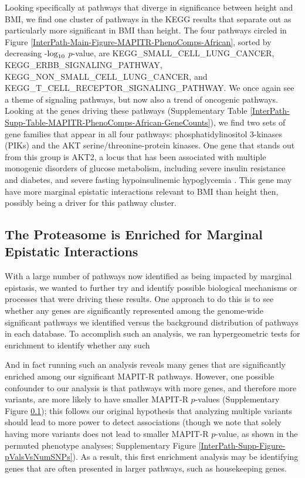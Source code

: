 \documentclass[12pt,a4paper]{article}
\def\log{{\rm log}}
\begin{document}
Looking specifically at pathways that diverge in significance between height and BMI, we find one cluster of pathways in the KEGG results that separate out as particularly more significant in BMI than height. The four pathways circled in Figure \ref{InterPath-Main-Figure-MAPITR-PhenoComps-African}, sorted by decreasing -$\log_{10}$ $p$-value, are KEGG\_SMALL\_CELL\_LUNG\_CANCER, KEGG\_ERBB\_SIGNALING\_PATHWAY, KEGG\_NON\_SMALL\_CELL\_LUNG\_CANCER, and KEGG\_T\_CELL\_RECEPTOR\_SIGNALING\_PATHWAY. We once again see a theme of signaling pathways, but now also a trend of oncogenic pathways. Looking at the genes driving these pathways (Supplementary Table \ref{InterPath-Supp-Table-MAPITR-PhenoComps-African-GeneCounts}), we find two sets of gene families that appear in all four pathways: phosphatidylinositol 3-kinases (PIKs) and the AKT serine/threonine-protein kinases. One gene that stands out from this group is AKT2, a locus that has been associated with multiple monogenic disorders of glucose metabolism, including severe insulin resistance and diabetes, and severe fasting hypoinsulinemic hypoglycemia \citep{George2004,Manning2017,Latva-Rasku2018}. This gene may have more marginal epistatic interactions relevant to BMI than height then, possibly being a driver for this pathway cluster.

\subsection{The Proteasome is Enriched for Marginal Epistatic Interactions}

With a large number of pathways now identified as being impacted by marginal epistasis, we wanted to further try and identify possible biological mechanisms or processes that were driving these results. One approach to do this is to see whether any genes are significantly represented among the genome-wide significant pathways we identified versus the background distribution of pathways in each database. To accomplish such an analysis, we ran hypergeometric tests for enrichment to identify whether any such 

And in fact running such an analysis reveals many genes that are significantly enriched among our significant MAPIT-R pathways. However, one possible confounder to our analysis is that pathways with more genes, and therefore more variants, are more likely to have smaller MAPIT-R $p$-values (Supplementary Figure \ref{}); this follows our original hypothesis that analyzing multiple variants should lead to more power to detect associations (though we note that solely having more variants does not lead to smaller MAPIT-R $p$-value, as shown in the permuted phenotype analyses; Supplementary Figure \ref{InterPath-Supp-Figure-pValsVsNumSNPs}). As a result, this first enrichment analysis may be identifying genes that are often presented in larger pathways, such as housekeeping genes. 
\end{document}

